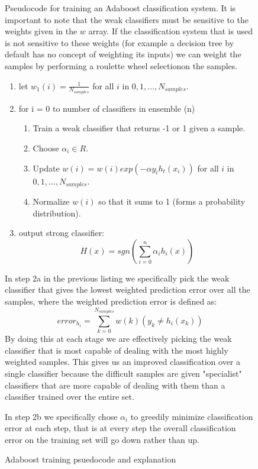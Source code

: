 \documentclass[ %
                    author={Sam Phippen},
                supervisor={Dr. Rafal Bogacz},
                     title={Real time voice activity detectors in noisy personal computing environments},
                  subtitle={},
                    degree={MEng},
                      year={2012} ]{thesis}
\begin{document}
\begin{figure}
    Pseudocode for training an Adaboost classification system. It is important
    to note that the weak classifiers must be sensitive to the weights given in
    the $w$ array. If the classification system that is used is not sensitive
    to these weights (for example a decision tree by default has no concept of
    weighting its inputs) we can weight the samples by performing a roulette
    wheel selection\footnotemark on the samples.

    \vspace{3em}

    \begin{enumerate}

        \item let $w_1(i)=\frac{1}{N_{samples}}$ for all $i$ in
            $0,1,...,N_{samples}$.

        \item for i = 0 to number of classifiers in ensemble (n)
            \begin{enumerate}

                \item Train a weak classifier that returns -1 or 1 given a
                    sample.
                \item Choose $\alpha_i \in R$.
                \item Update $w(i) = w(i)exp(-\alpha y_i h_t(x_i))$ for all $i$ in
            $0,1,...,N_{samples}$.
            \item Normalize $w(i)$ so that it sums to 1 (forms a probability distribution).

            \end{enumerate}
        \item output strong classifier: $$H(x) = sgn\left(\sum_{i=0}^{n}\alpha_i h_i(x)\right)$$
    \end{enumerate}

    \vspace{3em}

    In step 2a in the previous listing we specifically pick the weak classifier
    that gives the lowest weighted prediction error over all the samples, where
    the weighted prediction error is defined as: $$error_{h_i} =
    \sum_{k=0}^{N_{samples}} w(k)(y_k\neq h_i(x_k))$$By doing this at each
    stage we are effectively picking the weak classifier that is most capable
    of dealing with the most highly weighted samples. This gives us an improved
    classification over a single classifier because the difficult samples are
    given "specialist" classifiers that are more capable of dealing with them
    than a classifier trained over the entire set.

    In step 2b we specifically chose $\alpha_i$ to greedily minimize
    classification error at each step, that is at every step the overall
    classification error on the training set will go down rather than up.

    \caption{Adaboost training psuedocode and explanation}
    \label{pseudo:adaboost}

\end{figure}
\end{document}
